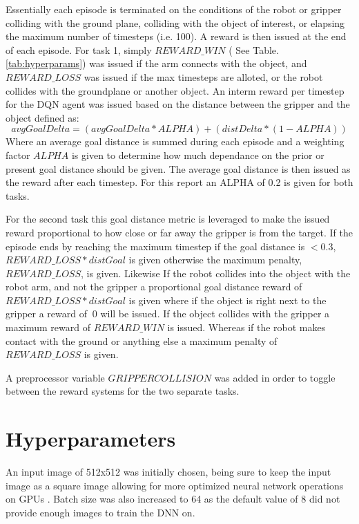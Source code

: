 \documentclass[1p, number, sort&compress,table, 11pt]{elsarticle}
\begin{document}
	Essentially each episode is terminated on the conditions of the robot or gripper colliding with the ground plane, colliding with the object of interest, or elapsing the maximum number of timesteps (i.e. 100). A reward is then issued at the end of each episode. For task 1, simply $REWARD\_WIN$ ( See Table.\ref{tab:hyperparams}) was issued if the arm connects with the object, and $REWARD\_LOSS$ was issued if the max timesteps are alloted, or the robot collides with the groundplane or another object. An interm reward per timestep for the DQN agent was issued based on the distance between the gripper and the object defined as:
	\begin{equation}
	avgGoalDelta  = (avgGoalDelta * ALPHA) + (distDelta * (1 - ALPHA))
	\end{equation}
	Where an average goal distance is summed during each episode and a weighting factor $ALPHA$ is given to determine how much dependance on the prior or present goal distance should be given. The average goal distance is then issued as the reward after each timestep. For this report an ALPHA of 0.2 is given for both tasks.  

	For the second task this goal distance metric is leveraged to make the issued reward proportional to how close or far away the gripper is from the target. If the episode ends by reaching the maximum timestep if the goal distance is $<0.3$, $REWARD\_LOSS * distGoal$ is given otherwise the maximum penalty, $REWARD\_LOSS$, is given. Likewise If the robot collides into the object with the robot arm, and not the gripper a proportional goal distance reward of $REWARD\_LOSS * distGoal$ is given where if the object is right next to the gripper a reward of $~0$ will be issued. If the object collides with the gripper a maximum reward of $REWARD\_WIN$ is issued. Whereas if the robot makes contact with the ground or anything else a maximum penalty of $REWARD\_LOSS$ is given.

	A preprocessor variable $GRIPPERCOLLISION$ was added in order to toggle between the reward systems for the two separate tasks. 
	
	
	\section{Hyperparameters}\label{sec:experimental}

	An input image of 512x512 was initially chosen, being sure to keep the input image as a square image allowing for more optimized neural network operations on GPUs \cite{UdacityLesson23}. Batch size was also increased to 64 as the default value of 8 did not provide enough images to train the DNN on.
\end{document}
